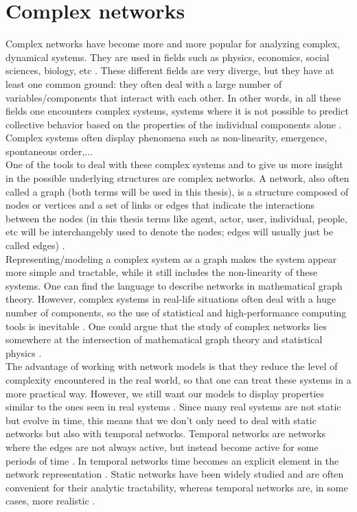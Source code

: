 \documentclass[11 pt , letterpaper , twoside , openright]{book}
\begin{document}
\section{Complex networks}\label{complNet}

Complex networks have become more and more popular for analyzing complex, dynamical systems. They are used in fields such as physics, economics, social sciences, biology, etc \cite{Costa2008}. These different fields are very diverge, but they have at least one common ground: they often deal with a large number of variables/components that interact with each other. In other words, in all these fields one encounters complex systems, systems where it is not possible to predict collective behavior based on the properties of the individual components alone \cite{Mata2020}. Complex systems often display phenomena such as non-linearity, emergence, spontaneous order,...
\\
\newline
One of the tools to deal with these complex systems and to give us more insight in the possible underlying structures are complex networks. A network, also often called a graph (both terms will be used in this thesis), is a structure composed of nodes or vertices and a set of links or edges that indicate the interactions between the nodes (in this thesis terms like agent, actor, user, individual, people, etc will be interchangebly used to denote the nodes; edges will usually just be called edges) \cite{Mata2020}.\\
\newline
Representing/modeling a complex system as a graph makes the system appear more simple and tractable, while it still includes the non-linearity of these systems. One can find the language to describe networks in mathematical graph theory. However, complex systems in real-life situations often deal with a huge number of components, so the use of statistical and high-performance computing tools is inevitable \cite{Mata2020}. One could argue that the study of complex networks lies somewhere at the intersection of mathematical graph theory and statistical physics \cite{F.Costa2007}.\\
The advantage of working with network models is that they reduce the level of complexity encountered in the real world, so that one can treat these systems in a more practical way. However, we still want our models to display properties similar to the ones seen in real systems \cite{Mata2020}. Since many real systems are not static but evolve in time, this means that we don't only need to deal with static networks but also with temporal networks. Temporal networks are networks where the edges are not always active, but instead become active for some periods of time \cite{Holme2012}. In temporal networks time becomes an explicit element in the network representation \cite{Holme2012}. Static networks have been widely studied and are often convenient for their analytic tractability, whereas temporal networks are, in some cases, more realistic \cite{Mata2020}.\\
\end{document}
